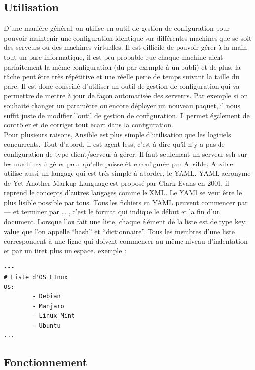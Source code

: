 \documentclass[]{article}
\begin{document}
\subsection{Utilisation}\label{utilisation}

D'une manière général, on utilise un outil de gestion de configuration
pour pouvoir maintenir une configuration identique sur différentes
machines que se soit des serveurs ou des machines virtuelles. Il est
difficile de pouvoir gérer à la main tout un parc informatique, il est
peu probable que chaque machine aient parfaitement la même configuration
(du par exemple à un oubli) et de plus, la tâche peut être très
répétitive et une réelle perte de temps suivant la taille du parc. Il
est donc conseillé d'utiliser un outil de gestion de configuration qui
va permettre de mettre à jour de façon automatisée des serveurs. Par
exemple si on souhaite changer un paramètre ou encore déployer un
nouveau paquet, il nous suffit juste de modifier l'outil de gestion de
configuration. Il permet également de contrôler et de corriger tout
écart dans la configuration. \\
Pour plusieurs raisons, Ansible est plus
simple d'utilisation que les logiciels concurrents. Tout d'abord, il est
agent-less, c'est-à-dire qu'il n'y a pas de configuration de type
client/serveur à gérer. Il faut seulement un serveur ssh sur les
machines à gérer pour qu'elle puisse être configurée par Ansible.
Ansible utilise aussi un langage qui est très simple à aborder, le YAML.
YAML acronyme de Yet Another Markup Language est proposé par Clark Evans
en 2001, il reprend le concepts d'autres langages comme le XML. Le YAMl
se veut être le plus lisible possible par tous. Tous les fichiers en
YAML peuvent commencer par --- et terminer par \ldots{} , c'est le
format qui indique le début et la fin d'un document. Lorsque l'on fait
une liste, chaque élément de la liste est de type \og
key: value \fg que l'on appelle ``hash'' et
``dictionnaire''. Tous les membres d'une liste correspondent à une ligne
qui doivent commencer au même niveau d'indentation et par un tiret plus
un espace. exemple :
\begin{verbatim}
---
# Liste d'OS LInux
OS:
        - Debian
        - Manjaro
        - Linux Mint
        - Ubuntu
...
\end{verbatim}


\subsection{Fonctionnement}\label{fonctionnement-1}
\end{document}

